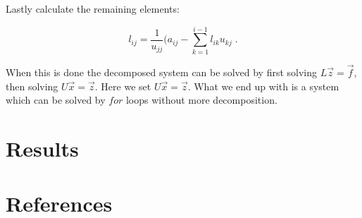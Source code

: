 \documentclass[english,a4paper, 11pt]{article}
\begin{document}
Lastly calculate the remaining elements:

\begin{equation}
l_{ij} = \frac{1}{u_{jj}}(a_{ij} - \sum_{k=1}^{i-1}l_{ik}u_{kj}\;.
\label{LUl}
\end{equation}

When this is done the decomposed system can be solved by first solving $L\vec{z} = \vec{f}$, then solving $U\vec{x} = \vec{z}$. Here we set $U\vec{x} = \vec{z}$. What we end up with is a system which can be solved by $for$ loops without more decomposition.






\section{Results}

\section{References}
\end{document}

